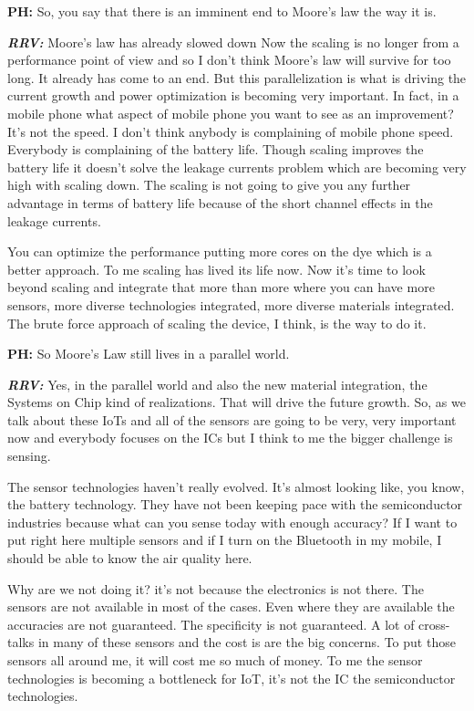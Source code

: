 \textbf{PH:}  So, you say that there is an imminent end to Moore’s law the way it is.

\textbf{\textit{RRV:}} Moore’s law has already slowed down Now the scaling is no longer from a performance point of view and so I don’t think Moore’s law will survive for too long. It already has come to an end. But this parallelization is what is driving the current growth and power optimization is becoming very important. In fact, in a mobile phone what aspect of mobile phone you want to see as an improvement? It’s not the speed. I don’t think anybody is complaining of mobile phone speed. Everybody is complaining of the battery life. Though scaling improves the battery life it doesn’t solve the leakage currents problem which are becoming very high with scaling down. The scaling is not going to give you any further advantage in terms of battery life because of the short channel effects in the leakage currents. 

You can optimize the performance putting more cores on the dye which is a better approach. To me scaling has lived its life now. Now it’s time to look beyond scaling and integrate that more than more where you can have more sensors, more diverse technologies integrated, more diverse materials integrated. The brute force approach of scaling the device, I think, is the way to do it.

\textbf{PH:} So Moore’s Law still lives in a parallel world. 

\textbf{\textit{RRV:}} Yes, in the parallel world and also the new material integration, the Systems on Chip kind of realizations. That will drive the future growth. So, as we talk about these IoTs and all of the sensors are going to be very, very important now and everybody focuses on the ICs but I think to me the bigger challenge is sensing.

The sensor technologies haven’t really evolved. It’s almost looking like, you know, the battery technology. They have not been keeping pace with the semiconductor industries because what can you sense today with enough accuracy? If I want to put right here multiple sensors and if I turn on the Bluetooth in my mobile, I should be able to know the air quality here.

Why are we not doing it? it’s not because the electronics is not there. The sensors are not available in most of the cases. Even where they are available the accuracies are not guaranteed. The specificity is not guaranteed. A lot of cross-talks in many of these sensors and the cost is are the big concerns. To put those sensors all around me, it will cost me so much of money. To me the sensor technologies is becoming a bottleneck for IoT, it’s not the IC the semiconductor technologies.

